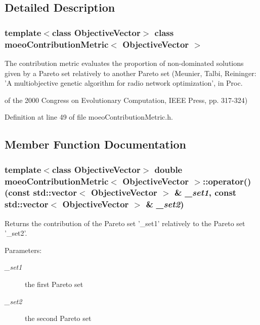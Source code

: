 \subsection{Detailed Description}
\subsubsection*{template$<$class Objective\-Vector$>$ class moeo\-Contribution\-Metric$<$ Objective\-Vector $>$}

The contribution metric evaluates the proportion of non-dominated solutions given by a Pareto set relatively to another Pareto set (Meunier, Talbi, Reininger: 'A multiobjective genetic algorithm for radio network optimization', in Proc. 

of the 2000 Congress on Evolutionary Computation, IEEE Press, pp. 317-324) 



Definition at line 49 of file moeo\-Contribution\-Metric.h.

\subsection{Member Function Documentation}
\subsubsection{\setlength{\rightskip}{0pt plus 5cm}template$<$class Objective\-Vector$>$ double \bf{moeo\-Contribution\-Metric}$<$ Objective\-Vector $>$::operator() (const std::vector$<$ Objective\-Vector $>$ \& {\em \_\-set1}, const std::vector$<$ Objective\-Vector $>$ \& {\em \_\-set2})\hspace{0.3cm}{\tt  [inline]}}\label{classmoeoContributionMetric_491610f6557874c2989eaa7a75117dcb}


Returns the contribution of the Pareto set '\_\-set1' relatively to the Pareto set '\_\-set2'. 

\begin{Desc}
\item[Parameters:]
\begin{description}
\item[{\em \_\-set1}]the first Pareto set \item[{\em \_\-set2}]the second Pareto set \end{description}
\end{Desc}


